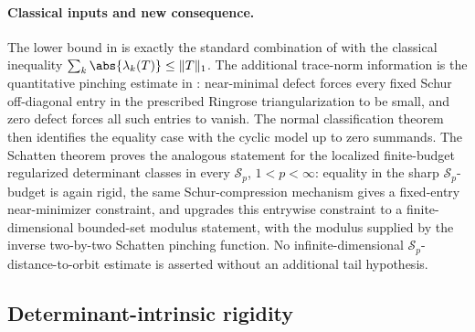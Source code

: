 \paragraph{Classical inputs and new consequence.}
  The lower bound in
   is exactly the standard
  combination of  with the classical
  inequality \(\sum_k\abs{\lambda_k(T)}\le \|T\|_1\). The additional
  trace-norm information is the quantitative pinching estimate in
  : near-minimal defect forces every fixed
  Schur off-diagonal entry in the prescribed Ringrose triangularization to
  be small, and zero defect forces all such entries to vanish. The normal
  classification theorem then identifies the equality case with the cyclic
  model up to zero summands. The Schatten theorem
   proves the analogous
  statement for the localized finite-budget regularized determinant classes in
  every \(\mathcal S_p\), \(1<p<\infty\): equality in the sharp
  \(\mathcal S_p\)-budget is again rigid, the same Schur-compression
  mechanism gives a fixed-entry near-minimizer constraint, and
   upgrades this
  entrywise constraint to a finite-dimensional bounded-set modulus
  statement, with the modulus supplied by the inverse two-by-two Schatten
  pinching function. No infinite-dimensional
  \(\mathcal S_p\)-distance-to-orbit estimate is asserted without an
  additional tail hypothesis.

\subsection{Determinant-intrinsic rigidity}\label{sec:determinant-intrinsic-classification}

